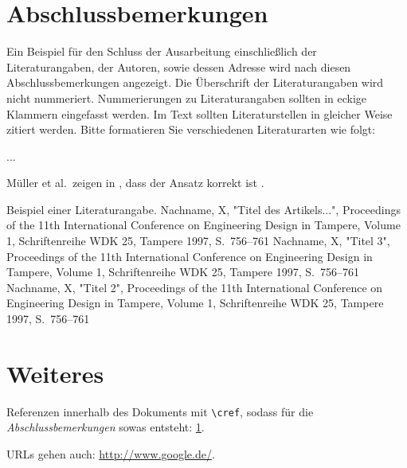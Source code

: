\documentclass[12pt,paper=a4]{scrartcl}
\begin{document}
\pagebreak
\section{Abschlussbemerkungen}\label{sec:abschluss}
Ein Beispiel für den Schluss der Ausarbeitung einschließlich der Literaturangaben, der Autoren, sowie dessen Adresse wird nach diesen Abschlussbemerkungen angezeigt.
Die Überschrift der Literaturangaben wird nicht nummeriert.
Nummerierungen zu Literaturangaben sollten in eckige Klammern eingefasst werden.
Im Text sollten Literaturstellen in gleicher Weise zitiert werden.
Bitte formatieren Sie verschiedenen Literaturarten wie folgt:

...

Müller et al.\ zeigen in \cite{article}, dass der Ansatz korrekt ist \cite{inproceeding, inproceeding2, inproceeding3}.

\begin{thebibliography}{}
	Beispiel einer Literaturangabe.
	Nachname, X, "Titel des Artikels...", Proceedings of the 11th International Conference on Engineering Design in Tampere, Volume 1, Schriftenreihe WDK 25, Tampere 1997, S.\ 756--761
	Nachname, X, "Titel 3", Proceedings of the 11th International Conference on Engineering Design in Tampere, Volume 1, Schriftenreihe WDK 25, Tampere 1997, S.\ 756--761
	Nachname, X, "Titel 2", Proceedings of the 11th International Conference on Engineering Design in Tampere, Volume 1, Schriftenreihe WDK 25, Tampere 1997, S.\ 756--761
\end{thebibliography}
%
%


\pagebreak

\section{Weiteres}
Referenzen innerhalb des Dokuments mit \texttt{\textbackslash cref}, sodass für die \textit{Abschlussbemerkungen} sowas entsteht: \cref{sec:abschluss}.

URLs gehen auch: \url{http://www.google.de/}.
\end{document}
